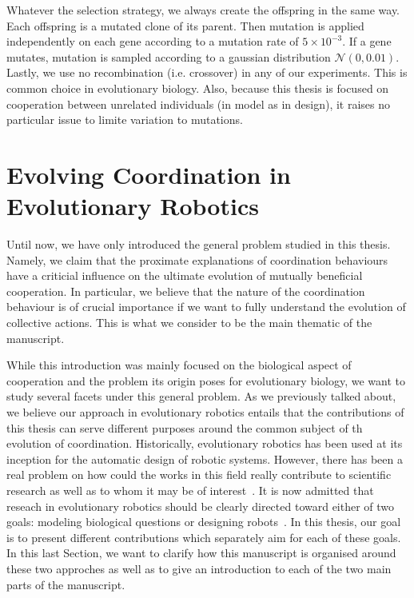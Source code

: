 
    Whatever the selection strategy, we always create the offspring in the same way. Each offspring is a mutated clone of its parent. Then mutation is applied independently on each gene according to a mutation rate of \(5 \times 10^{-3}\). If a gene mutates, mutation is sampled according to a gaussian distribution \(\mathcal{N}(0, 0.01)\). Lastly, we use no recombination (i.e. crossover) in any of our experiments. This is common choice in evolutionary biology. Also, because this thesis is focused on cooperation between unrelated individuals (in model as in design), it raises no particular issue to limite variation to mutations.


\section{Evolving Coordination in Evolutionary Robotics}

  Until now, we have only introduced the general problem studied in this thesis. Namely, we claim that the proximate explanations of coordination behaviours have a criticial influence on the ultimate evolution of mutually beneficial cooperation. In particular, we believe that the nature of the coordination behaviour is of crucial importance if we want to fully understand the evolution of collective actions. This is what we consider to be the main thematic of the manuscript. 

  While this introduction was mainly focused on the biological aspect of cooperation and the problem its origin poses for evolutionary biology, we want to study several facets under this general problem. As we previously talked about, we believe our approach in evolutionary robotics entails that the contributions of this thesis can serve different purposes around the common subject of th evolution of coordination. Historically, evolutionary robotics has been used at its inception for the automatic design of robotic systems. However, there has been a real problem on how could the works in this field really contribute to scientific research as well as to whom it may be of interest~\parencite{Trianni2014b, Doncieux2015a}. It is now admitted that reseach in evolutionary robotics should be clearly directed toward either of two goals: modeling biological questions or designing robots~\parencite{Trianni2014b}. In this thesis, our goal is to present different contributions which separately aim for each of these goals. In this last Section, we want to clarify how this manuscript is organised around these two approches as well as to give an introduction to each of the two main parts of the manuscript.
  
